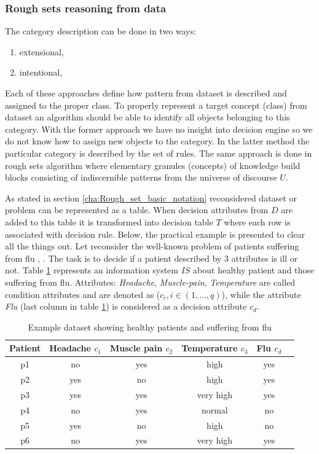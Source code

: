\subsubsection{Rough sets reasoning from data}
The category description can be done in two ways:
\begin{enumerate}
    \item extensional,
    \item intentional,
\end{enumerate}
Each of these approaches define how pattern from dataset is
described and assigned to the proper class. To properly represent a target concept (class) from dataset an
algorithm should be able to identify all objects belonging 
to this category. With the former approach we have no insight 
into decision engine so we do not know how to assign new objects to the category.
In the latter method the particular category is described by the set of rules. The same 
approach is done in rough sets algorithm where elementary 
granules (concepts) of knowledge build blocks consisting 
of indiscernible patterns from the universe of discourse $U$. 

As stated in section \ref{cha:Rough_set_basic_notation} reconsidered dataset or
problem can be represented as a table. When decision attributes from $D$ are
added to this table it is transformed into decision table $T$ where each
row is associated with decision rule. Below, the practical example is presented to 
clear all the things out. Let reconsider the well-known problem of patients suffering from
flu \cite{bib39}, \cite{bib40}. The task is to decide if a patient described by 3 attributes is ill or not. Table \ref{tab:example_rough_set} 
represents an information system $IS$ about healthy patient and those suffering
from flu. Attributes: \textit{Headache}, \textit{Muscle-pain},
\textit{Temperature} are called condition attributes and are denoted as ($c_i,i \in (1, \ldots, q)$),
while the attribute \textit{Flu} (last column in table \ref{tab:example_rough_set}) is considered as
a decision attribute $c_d$.
\begin{table}[H] 
    \centering
    \caption{Example dataset showing healthy patients and suffering from flu}
    \begin{tabular}{|c|c|c|c|c|c|}
        \hline 
    Patient & Headache $c_1$& Muscle pain $c_2$& Temperature $c_3$& Flu $c_d$\\ \hline \hline
    p1 & no & yes & high & yes \\ \hline
    p2 & yes & no & high & yes \\ \hline
    p3 & yes & yes & very high & yes \\ \hline
    p4 & no & yes & normal & no \\ \hline
    p5 & yes & no & high & no \\ \hline
    p6 & no & yes & very high & yes \\ \hline    
    \end{tabular}
    \label{tab:example_rough_set}
\end{table}

